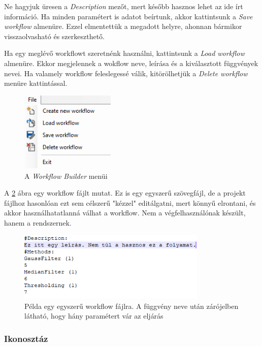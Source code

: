 \documentclass[a4paper,12pt]{article}
\begin{document}
Ne hagyjuk üresen a \textit{Description} mezőt, mert később hasznos lehet az ide írt információ. Ha minden paramétert is adatot beírtunk, akkor kattintsunk a \textit{Save workflow} almenüre. Ezzel elmentettük a megadott helyre, ahonnan bármikor visszaolvasható és szerkeszthető.

Ha egy meglévő workflowt szeretnénk használni, kattintsunk a \textit{Load workflow} almenüre. Ekkor megjelennek a wokflow neve, leírása és a kiválasztott függvények nevei. 
Ha valamely workflow feleslegessé válik, kitörölhetjük a \textit{Delete workflow} menüre kattintással.

	\begin{figure}
	\centering
	\includegraphics[width=4.5cm]{workflow_menu}
	\caption{A \textit{Workflow Builder} menüi}
	\label{fig:workflowmenu}
	\end{figure}

A \ref{fig:workflowfile} ábra egy workflow fájlt mutat. Ez is egy egyszerű szövegfájl, de a projekt fájlhoz hasonlóan ezt sem célszerű "kézzel" editálgatni, mert könnyű elrontani, és akkor használhatatlanná válhat a workflow. Nem a végfelhasználónak készült, hanem a rendszernek.

	\begin{figure}[h]
	\centering
	\includegraphics[width=9cm]{workflowfile}
	\caption{Példa egy egyszerű workflow fájlra. A függvény neve után zárójelben látható, hogy hány paramétert vár az eljárás}
	\label{fig:workflowfile}
	\end{figure}


\subsubsection{Ikonosztáz}
\end{document}
